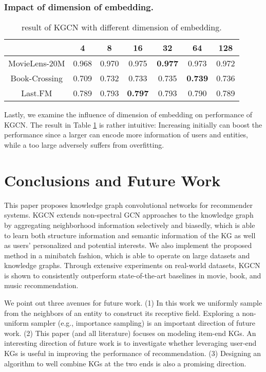 \documentclass[sigconf]{acmart}
\begin{document}
			
		\subsubsection{Impact of dimension of embedding.}
			\begin{table}[t]
				\centering
				\setlength{\tabcolsep}{4pt}
				\caption{ result of KGCN with different dimension of embedding.}
				\begin{tabular}{c|cccccc}
					\hline
					 & 4 & 8 & 16 & 32 & 64 & 128\\
					\hline
					MovieLens-20M & 0.968 & 0.970 & 0.975 & \textbf{0.977} & 0.973 & 0.972\\
					Book-Crossing & 0.709 & 0.732 & 0.733 & 0.735 & \textbf{0.739} & 0.736\\
					Last.FM & 0.789 & 0.793 & \textbf{0.797} & 0.793 & 0.790 & 0.789\\
					\hline
				\end{tabular}
				\label{table:d}
			\end{table}
			
			Lastly, we examine the influence of dimension of embedding  on performance of KGCN.
			The result in Table \ref{table:d} is rather intuitive:
			Increasing  initially can boost the performance since a larger  can encode more information of users and entities, while a too large  adversely suffers from overfitting.
			
			
	
\section{Conclusions and Future Work}
	This paper proposes knowledge graph convolutional networks for recommender systems.
	KGCN extends non-spectral GCN approaches to the knowledge graph by aggregating neighborhood information selectively and biasedly, which is able to learn both structure information and semantic information of the KG as well as users' personalized and potential interests.
	We also implement the proposed method in a minibatch fashion, which is able to operate on large datasets and knowledge graphs.
	Through extensive experiments on real-world datasets, KGCN is shown to consistently outperform state-of-the-art baselines in movie, book, and music recommendation.
	
	We point out three avenues for future work.
	(1) In this work we uniformly sample from the neighbors of an entity to construct its receptive field.
	Exploring a non-uniform sampler (e.g., importance sampling) is an important direction of future work.
	(2) This paper (and all literature) focuses on modeling item-end KGs.
	An interesting direction of future work is to investigate whether leveraging user-end KGs is useful in improving the performance of  recommendation.
	(3) Designing an algorithm to well combine KGs at the two ends is also a promising direction.


 
\end{document}
